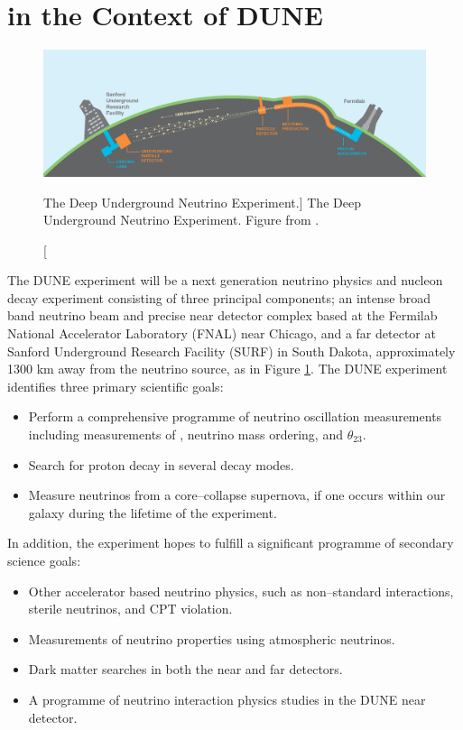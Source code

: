\section{\protodune{} in the Context of DUNE} \label{sec:pdsp_dune}

\begin{figure}

	\centering

	\includegraphics[width=\textwidth]{figures/dune_baseline.png}

	\caption
	[The Deep Underground Neutrino Experiment.]
	{The Deep Underground Neutrino Experiment. Figure from \cite{Abi:2020wmh}.}

	\label{fig:dune_baseline}

\end{figure}

The DUNE experiment will be a next generation neutrino physics and nucleon decay
experiment consisting of three principal components; an intense broad band 
neutrino beam and precise near detector complex based at the Fermilab National 
Accelerator Laboratory (FNAL) near Chicago, and a far detector at Sanford Underground 
Research Facility (SURF) in South Dakota, approximately 1300 km away from the 
neutrino source, as in Figure \ref{fig:dune_baseline}. The DUNE experiment 
identifies three primary scientific goals\cite{Abi:2020evt}:
\begin{itemize}
	\item Perform a comprehensive programme of neutrino oscillation measurements
		including measurements of \dcp{}, neutrino mass ordering, and $\theta_{23}$.
	\item Search for proton decay in several decay modes.
	\item Measure neutrinos from a core--collapse supernova, if one occurs within 
		our galaxy during the lifetime of the experiment.
\end{itemize}
In addition, the experiment hopes to fulfill a significant programme of
secondary science goals:
\begin{itemize}
	\item Other accelerator based neutrino physics, such as non--standard
		interactions, sterile neutrinos, and CPT violation.
	\item Measurements of neutrino properties using atmospheric neutrinos.
	\item Dark matter searches in both the near and far detectors.
	\item A programme of neutrino interaction physics studies in the DUNE near
		detector.
\end{itemize}

